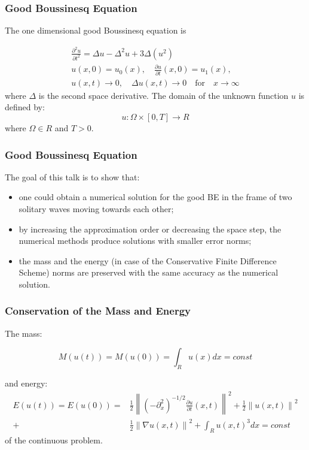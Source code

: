 \documentclass{beamer}
\newcommand{\be}{\begin{equation}}
\newcommand{\ee}{\end{equation}}
\begin{document}
\begin{frame}
\frametitle{Good Boussinesq Equation}


The one dimensional good Boussinesq equation is

\begin{align}\label{problem}
 \frac{\partial^2 u}{\partial t^2}= \Delta u -  \Delta^2 u +  3 \Delta (u^2)
\\
u(x,0) = u_0(x), \quad \frac{\partial u}{\partial t}(x,0)=u_1(x), \nonumber
\\
u(x,t) \rightarrow 0, \quad \Delta u(x, t) \rightarrow 0 \quad \text{for} \quad x \rightarrow \infty \nonumber
\end{align}
where $\Delta$ is the second space derivative. The domain of the unknown function $u$ is defined by:
\be
 u:\Omega \times [0, T] \rightarrow R
\ee
where $\Omega \in R$ and $T>0$.
\end{frame}



\begin{frame}
\frametitle{Good Boussinesq Equation}

The goal of this talk is to show that:
\begin{itemize}
 \item one could obtain a numerical solution for the good BE in the frame of two solitary waves moving towards each other;
 \item by increasing the approximation order or decreasing the space step, the numerical methods produce  solutions with smaller error norms;
 \item the mass and the energy (in case of the Conservative Finite Difference Scheme) norms are preserved with the same accuracy as the numerical solution.
\end{itemize}

\end{frame}


\begin{frame}
\frametitle{Conservation of the Mass and Energy}
The mass:

\begin{equation}\label{int}
M(u(t))=M(u(0))=\int_{R} u(x)dx = const
\end{equation}

and energy:
\begin{align}\label{ex-en}
E(u(t)) = E(u(0)) =&\frac{1}{2} \left\|(-\partial^2_x)^{-1/2} \frac{\partial u}{\partial t}(x,t)\right\|^2 + \frac{1}{2}  \left\|u (x,t)\right\|^2 
 \nonumber\\
+& \frac{1}{2}\left\| \nabla u(x,t) \right\|^2+ \int _{R} u(x,t)^3  dx = const
\end{align}
of the continuous problem.
\end{frame}
\end{document}
